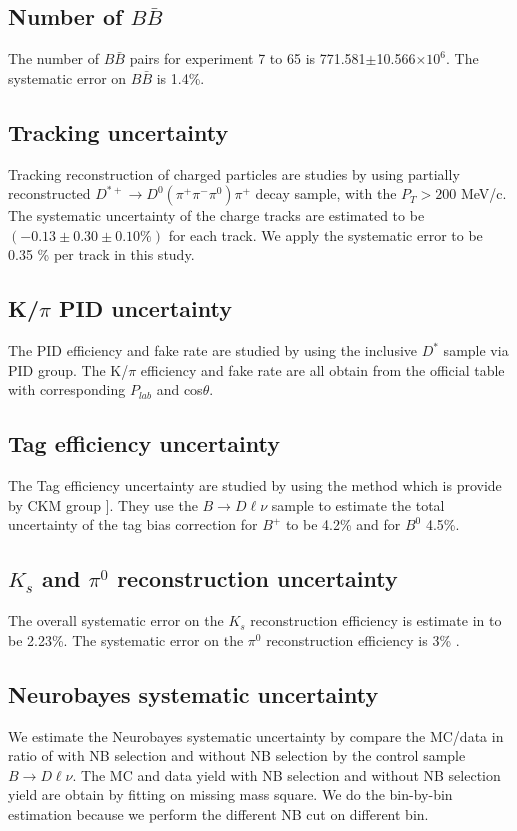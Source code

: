 \subsection{Number of $B\bar{B}$}
The number of $B\bar{B}$ pairs for experiment 7 to 65 is 771.581$\pm$10.566$\times 10^6$. The systematic error on $B\bar{B}$ is 1.4\%.
\subsection{Tracking uncertainty}
Tracking reconstruction of charged particles are studies by using partially reconstructed $D^{*+} \rightarrow D^0(\pi^+\pi^-\pi^0)\pi^+$ decay sample, with the $P_T > 200 $ MeV/c. The systematic uncertainty of the charge tracks are estimated to be $(-0.13 \pm 0.30 \pm 0.10 \%)$ for each track. We apply the systematic error to be 0.35 \% per track in this study.
\subsection{K/$\pi$ PID uncertainty}
The PID efficiency and fake rate are studied by using the inclusive $D^*$ sample via PID group. The K/$\pi$ efficiency and fake rate are all obtain from the official table with corresponding $P_{lab}$ and cos$\theta$.
\subsection{Tag efficiency uncertainty}
The Tag efficiency uncertainty are studied by using the method which is provide by CKM group\cite{ref:Varvell2012} ]. They use the $B\rightarrow D \ell \nu$ sample to estimate the total uncertainty of the tag bias correction for $B^+$ to be 4.2\% and for $B^0$ 4.5\%.
\subsection{$K_s$ and $\pi^0$ reconstruction uncertainty}
The overall systematic error on the $K_s$ reconstruction efficiency is estimate in \cite{ref:White2011} to be 2.23\%. The systematic error on the $\pi^0$ reconstruction efficiency is 3\% \cite{ref:Chang2012a}.
\subsection{Neurobayes systematic uncertainty}
We estimate the Neurobayes systematic uncertainty by compare the MC/data in ratio of with NB selection and without NB selection by the control sample $B \rightarrow D \ell \nu $. The MC and data yield with NB selection and without NB selection yield are obtain by fitting on missing mass square. We do the bin-by-bin estimation because we perform the different NB cut on different bin. 
